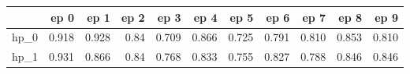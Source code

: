 \begin{tabular}{lrrrrrrrrrr}
\toprule
{} &   ep 0 &   ep 1 &  ep 2 &   ep 3 &   ep 4 &   ep 5 &   ep 6 &   ep 7 &   ep 8 &   ep 9 \\
\midrule
hp\_0 &  0.918 &  0.928 &  0.84 &  0.709 &  0.866 &  0.725 &  0.791 &  0.810 &  0.853 &  0.810 \\
hp\_1 &  0.931 &  0.866 &  0.84 &  0.768 &  0.833 &  0.755 &  0.827 &  0.788 &  0.846 &  0.846 \\
\bottomrule
\end{tabular}
